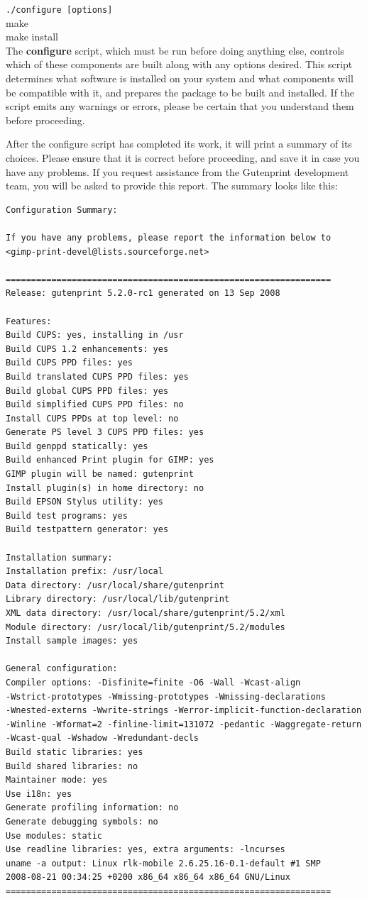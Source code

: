 \documentclass{article}[letter]
\def\code#1{\texttt{#1}}
\begin{document}
\code{./configure [options]} \\
make \\
make install \\

The {\bf configure} script, which must be run before doing anything else,
controls which of these components are built along with any options
desired. This script determines what software is installed on your
system and what components will be compatible with it, and prepares the
package to be built and installed. If the script emits any warnings or
errors, please be certain that you understand them before proceeding.

After the configure script has completed its work, it will print a
summary of its choices. Please ensure that it is correct before
proceeding, and save it in case you have any problems. If you request
assistance from the Gutenprint development team, you will be asked to
provide this report. The summary looks like this:

\begin{verbatim}
Configuration Summary:

If you have any problems, please report the information below to
<gimp-print-devel@lists.sourceforge.net>

================================================================
Release: gutenprint 5.2.0-rc1 generated on 13 Sep 2008

Features:
Build CUPS: yes, installing in /usr
Build CUPS 1.2 enhancements: yes
Build CUPS PPD files: yes
Build translated CUPS PPD files: yes
Build global CUPS PPD files: yes
Build simplified CUPS PPD files: no
Install CUPS PPDs at top level: no
Generate PS level 3 CUPS PPD files: yes
Build genppd statically: yes
Build enhanced Print plugin for GIMP: yes
GIMP plugin will be named: gutenprint
Install plugin(s) in home directory: no
Build EPSON Stylus utility: yes
Build test programs: yes
Build testpattern generator: yes

Installation summary:
Installation prefix: /usr/local
Data directory: /usr/local/share/gutenprint
Library directory: /usr/local/lib/gutenprint
XML data directory: /usr/local/share/gutenprint/5.2/xml
Module directory: /usr/local/lib/gutenprint/5.2/modules
Install sample images: yes

General configuration:
Compiler options: -Disfinite=finite -O6 -Wall -Wcast-align
-Wstrict-prototypes -Wmissing-prototypes -Wmissing-declarations
-Wnested-externs -Wwrite-strings -Werror-implicit-function-declaration
-Winline -Wformat=2 -finline-limit=131072 -pedantic -Waggregate-return
-Wcast-qual -Wshadow -Wredundant-decls
Build static libraries: yes
Build shared libraries: no
Maintainer mode: yes
Use i18n: yes
Generate profiling information: no
Generate debugging symbols: no
Use modules: static
Use readline libraries: yes, extra arguments: -lncurses
uname -a output: Linux rlk-mobile 2.6.25.16-0.1-default #1 SMP
2008-08-21 00:34:25 +0200 x86_64 x86_64 x86_64 GNU/Linux
================================================================
\end{verbatim}
\end{document}
